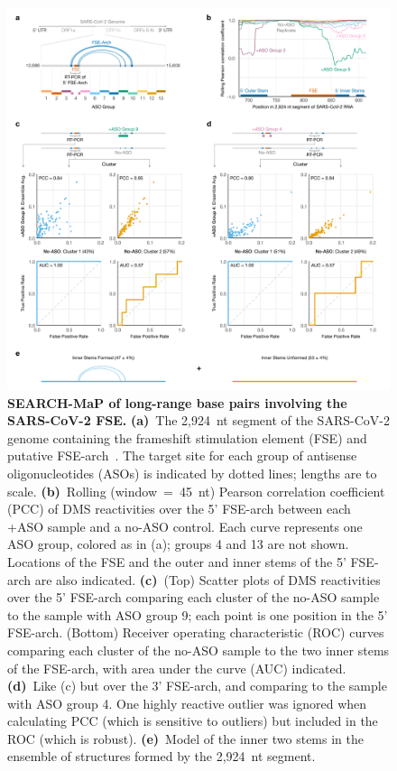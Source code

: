 \documentclass[main.tex]{subfiles}
\begin{document}
\begin{figure}[H]
	\includegraphics[width=\textwidth]{../MainFigures/sars2-tile/sars2-tile.png}
	\caption{\textbf{SEARCH-MaP of long-range base pairs involving the SARS-CoV-2 FSE.} \textbf{(a)}~The 2,924~nt segment of the SARS-CoV-2 genome containing the frameshift stimulation element (FSE) and putative FSE-arch~\cite{Ziv2020}. The target site for each group of antisense oligonucleotides (ASOs) is indicated by dotted lines; lengths are to scale. \textbf{(b)}~Rolling (window~=~45~nt) Pearson correlation coefficient (PCC) of DMS reactivities over the 5' FSE-arch between each +ASO sample and a no-ASO control. Each curve represents one ASO group, colored as in (a); groups 4 and 13 are not shown. Locations of the FSE and the outer and inner stems of the 5' FSE-arch are also indicated. \textbf{(c)}~(Top) Scatter plots of DMS reactivities over the 5' FSE-arch comparing each cluster of the no-ASO sample to the sample with ASO group 9; each point is one position in the 5' FSE-arch. (Bottom) Receiver operating characteristic (ROC) curves comparing each cluster of the no-ASO sample to the two inner stems of the FSE-arch, with area under the curve (AUC) indicated. \textbf{(d)}~Like (c) but over the 3' FSE-arch, and comparing to the sample with ASO group 4. One highly reactive outlier was ignored when calculating PCC (which is sensitive to outliers) but included in the ROC (which is robust). \textbf{(e)}~Model of the inner two stems in the ensemble of structures formed by the 2,924~nt segment.}
	\label{tiles}
\end{figure}
\end{document}
